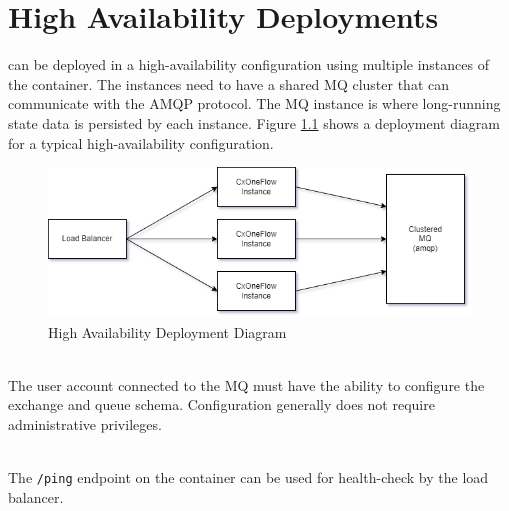 \chapter{High Availability Deployments}
\label{sec:high-availability}


\cxoneflow can be deployed in a high-availability configuration using multiple instances of
the \cxoneflow container.  The \cxoneflow instances need to have a shared MQ cluster that
can communicate with the AMQP protocol.  The MQ instance is where long-running state data
is persisted by each instance.  Figure \ref{fig:ha-diagram} shows a deployment diagram for
a typical high-availability configuration.


\begin{figure}[h]
    \includegraphics[width=\textwidth]{graphics/cxoneflow-diagrams-HA.png}
    \caption{High Availability Deployment Diagram}
    \label{fig:ha-diagram}
\end{figure}


\noindent\\The user account connected to the MQ must have the ability to configure the
exchange and queue schema.  Configuration generally does not require administrative privileges.

\noindent\\The \texttt{/ping} endpoint on the \cxoneflow container can be used
for health-check by the load balancer.


